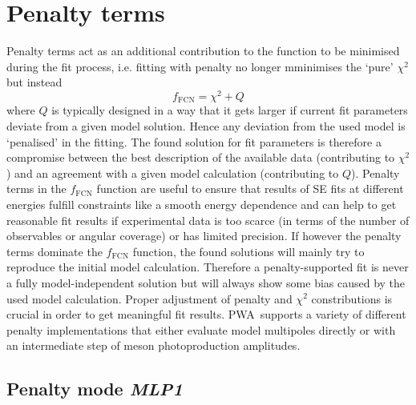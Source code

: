 \documentclass[a4paper,10pt]{article}
\def\PWA{\ttfamily PWA\rmfamily\ }
\begin{document}
\section{Penalty terms}

Penalty terms act as an additional contribution to the function to be minimised during the fit process, i.e. fitting with penalty
no longer mminimises the `pure' $\chi^2$ but instead
\begin{displaymath}
 f_\mathrm{FCN} = \chi^2 + Q
\end{displaymath}
where $Q$ is typically designed in a way that it gets larger if current fit parameters deviate from a given
model solution. Hence any deviation from the used model is `penalised' in the fitting. The found solution
for fit parameters is therefore a compromise between the best description of the available data (contributing to $\chi^2$)
and an agreement with a given model calculation (contributing to $Q$).
Penalty terms in the $f_\mathrm{FCN}$ function are useful to ensure that results of SE fits at different energies
fulfill constraints like a smooth energy dependence and can help to get reasonable fit results
if experimental data is too scarce (in terms of the number of observables or angular coverage) or has limited precision.
If however the penalty terms dominate the $f_\mathrm{FCN}$
function, the found solutions will mainly try to reproduce the initial model calculation. Therefore a penalty-supported fit 
is never a fully model-independent solution but will always show some bias caused by the used model calculation.
Proper adjustment of penalty and $\chi^2$ constributions is crucial in order to get meaningful fit results.
\PWA supports a variety of different penalty implementations that either evaluate model multipoles directly or with
an intermediate step of meson photoproduction amplitudes.

\subsection{Penalty mode \textit{MLP1}}
\end{document}
